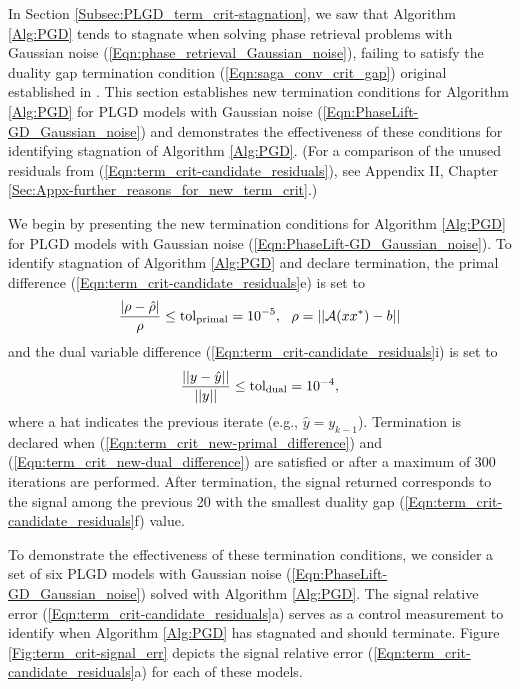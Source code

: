 In Section \ref{Subsec:PLGD_term_crit-stagnation}, we saw that Algorithm \ref{Alg:PGD} tends to stagnate when solving phase retrieval problems with Gaussian noise (\ref{Eqn:phase_retrieval_Gaussian_noise}), failing to satisfy the duality gap termination condition (\ref{Eqn:saga_conv_crit_gap}) original established in \cite{DBLP:journals/siamsc/FriedlanderM16}.  
This section establishes new termination conditions for Algorithm \ref{Alg:PGD} for PLGD models with Gaussian noise (\ref{Eqn:PhaseLift-GD_Gaussian_noise}) and demonstrates the effectiveness of these conditions for identifying stagnation of Algorithm \ref{Alg:PGD}.  
(For a comparison of the unused residuals from (\ref{Eqn:term_crit-candidate_residuals}), see Appendix II, Chapter \ref{Sec:Appx-further_reasons_for_new_term_crit}.)







We begin by presenting the new termination conditions for Algorithm \ref{Alg:PGD} for PLGD models with Gaussian noise (\ref{Eqn:PhaseLift-GD_Gaussian_noise}).  To identify stagnation of Algorithm \ref{Alg:PGD} and declare termination, the primal difference (\ref{Eqn:term_crit-candidate_residuals}e) is set to 
\begin{equation}
	\label{Eqn:term_crit_new-primal_difference}
\frac{| \rho - \hat{\rho} |}{\rho} \leq  \textnormal{tol}_\textnormal{primal} = 10^{-5}, \ \ \rho = ||{\mathcal A}(xx^*) - b||
\end{equation}
and the dual variable difference (\ref{Eqn:term_crit-candidate_residuals}i) is set to
\begin{equation}
	\label{Eqn:term_crit_new-dual_difference}
\frac{||y- \hat{y}||}{||y||} \leq \textnormal{tol}_\textnormal{dual}= 10^{-4},
\end{equation}
where a hat indicates the previous iterate (e.g., $\hat{y} = y_{k-1}$).  Termination is declared when (\ref{Eqn:term_crit_new-primal_difference}) and (\ref{Eqn:term_crit_new-dual_difference}) are satisfied or after a maximum of 300 iterations are performed.  After termination, the signal returned corresponds to the signal among the previous 20 with the smallest duality gap (\ref{Eqn:term_crit-candidate_residuals}f) value.  










To demonstrate the effectiveness of these termination conditions, we consider a set of six PLGD models with Gaussian noise (\ref{Eqn:PhaseLift-GD_Gaussian_noise}) solved with Algorithm \ref{Alg:PGD}.   The signal relative error (\ref{Eqn:term_crit-candidate_residuals}a) serves as a control measurement to identify when Algorithm \ref{Alg:PGD} has stagnated and should terminate.  Figure \ref{Fig:term_crit-signal_err} depicts the signal relative error (\ref{Eqn:term_crit-candidate_residuals}a) for each of these models.


